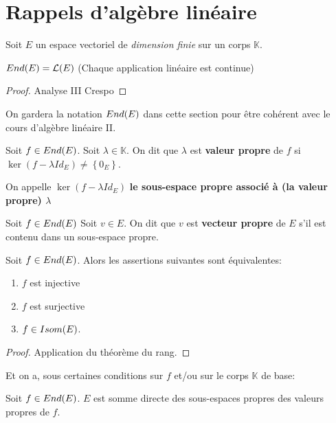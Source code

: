 \section{Rappels d'algèbre linéaire}

Soit $E$ un espace vectoriel de \textit{dimension finie} sur un corps
$\mathbb{K}$.

\begin{proposition}
	$End(E) = \mathcal{L}(E)$
	(Chaque application linéaire est continue)
\end{proposition}

\begin{proof}
	Analyse III Crespo
\end{proof}

On gardera la notation $End(E)$ dans cette section pour être
cohérent avec le cours d'algèbre linéaire II.

\begin{definition}
	\label{def:alg_lin_valeur_propre}
	Soit $f \in End(E)$.
	Soit $\lambda \in \mathbb{K}$.
	On dit que $\lambda$ est \textbf{valeur propre} de $f$ si $\ker(f - \lambda
		Id_{E}) \neq \left\{ 0_{E} \right\}$.
	
	On appelle $\ker(f - \lambda Id_{E})$ \textbf{le sous-espace propre associé
	à (la valeur propre) $\lambda$}
\end{definition}

\begin{definition}
	\label{def:alg_lin_vecteur_propre}
	Soit $f \in End(E)$
	Soit $v \in E$.
	On dit que $v$ est \textbf{vecteur propre} de $E$ s'il est contenu dans un
	sous-espace propre.
\end{definition}

\begin{proposition}
	Soit $f \in End(E)$.
	Alors les assertions suivantes sont équivalentes:

	\begin{enumerate}
		\item $f$ est injective
		\item $f$ est surjective
		\item $f \in Isom(E)$.
	\end{enumerate}
\end{proposition}

\begin{proof}
	Application du théorème du rang.
\end{proof}

Et on a, sous certaines conditions sur $f$ et/ou sur le corps $\mathbb{K}$ de
base:

\begin{proposition}
	Soit $f \in End(E)$.
	$E$ est somme directe des sous-espaces propres des valeurs propres de $f$.
\end{proposition}
